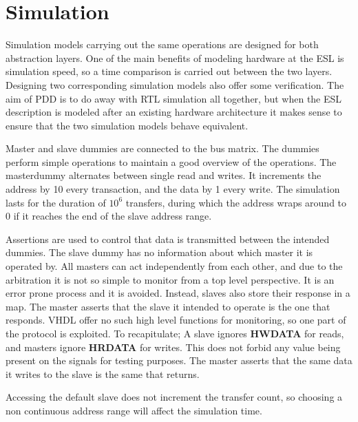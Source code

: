 \section{Simulation}
\label{sec:sim}
Simulation models carrying out the same operations are designed for both abstraction layers. One of the main benefits of modeling hardware at the ESL is simulation speed, so a time comparison is carried out between the two layers. Designing two corresponding simulation models also offer some verification. 
The aim of PDD is to do away with RTL simulation all together, but when the ESL description is modeled after an existing hardware architecture it makes sense
to ensure that the two simulation models behave equivalent. \par
Master and slave dummies are connected to the bus matrix. The dummies perform simple operations to maintain a good overview of the operations. 
The masterdummy alternates between single read and writes. It increments the address by 10 every transaction, and the data by 1 every write. 
The simulation lasts for the duration of $10^6$ transfers, during which the address wraps around to 0 if it reaches the end of the slave address range. \par
Assertions are used to control that data is transmitted between the intended dummies. The slave dummy has no information about which master it is operated by. 
All masters can act independently from each other, and due to the arbitration it is not so simple to monitor from a top level perspective. It is an error prone
process and it is avoided. Instead, slaves also store their response in a map. The master asserts that the slave it intended to operate is the one that responds. VHDL offer no such high level functions for monitoring, so one part of the protocol is exploited. To recapitulate; A slave ignores \textbf{HWDATA} for reads, and masters ignore \textbf{HRDATA} for writes. This does not forbid any value being present on the signals for testing purposes. The master asserts
that the same data it writes to the slave is the same that returns. \par
Accessing the default slave does not increment the transfer count, so choosing a non continuous address range will affect the simulation time.  

